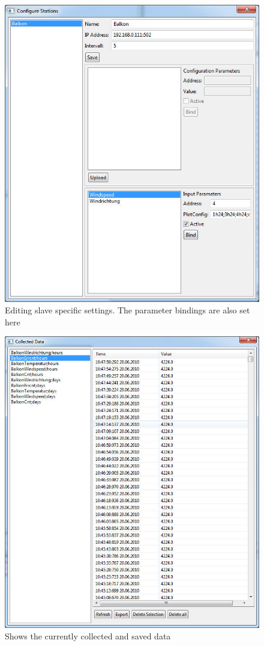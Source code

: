 \begin{figure}[p]
    \centering
    \includegraphics[width=\linewidth]{master/slaves.jpg}
    \caption{Editing slave specific settings. The parameter bindings are also set here}
    \label{fig:slaves}
\end{figure}

\begin{figure}[p]
    \centering
    \includegraphics[width=\linewidth]{master/viewdata.jpg}
    \caption{Shows the currently collected and saved data}
    \label{fig:data}
\end{figure}
